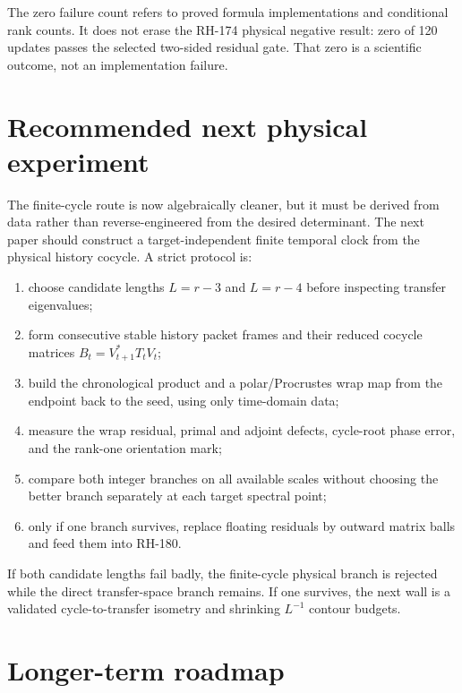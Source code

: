 \documentclass[12pt]{article}
\theoremstyle{remark}
\begin{document}
The zero failure count refers to proved formula implementations and
conditional rank counts.  It does not erase the RH-174 physical negative
result: zero of 120 updates passes the selected two-sided residual gate.  That
zero is a scientific outcome, not an implementation failure.

\section{Recommended next physical experiment}

The finite-cycle route is now algebraically cleaner, but it must be derived
from data rather than reverse-engineered from the desired determinant.  The
next paper should construct a target-independent finite temporal clock from
the physical history cocycle.  A strict protocol is:
\begin{enumerate}[leftmargin=2em]
\item choose candidate lengths $L=r-3$ and $L=r-4$ before inspecting transfer
eigenvalues;
\item form consecutive stable history packet frames and their reduced
cocycle matrices $B_t=V_{t+1}^*T_tV_t$;
\item build the chronological product and a polar/Procrustes wrap map from
the endpoint back to the seed, using only time-domain data;
\item measure the wrap residual, primal and adjoint defects, cycle-root phase
error, and the rank-one orientation mark;
\item compare both integer branches on all available scales without choosing
the better branch separately at each target spectral point;
\item only if one branch survives, replace floating residuals by outward
matrix balls and feed them into RH-180.
\end{enumerate}
If both candidate lengths fail badly, the finite-cycle physical branch is
rejected while the direct transfer-space branch remains.  If one survives,
the next wall is a validated cycle-to-transfer isometry and shrinking
$L^{-1}$ contour budgets.

\section{Longer-term roadmap}
\end{document}
